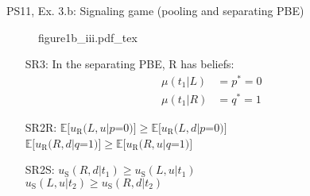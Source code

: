 \begin{frame}{PS11, Ex. 3.b: Signaling game (pooling and separating PBE)}
\begin{multicols}{2}
\begin{figure}[!h]
        {figure1b_iii.pdf_tex}
      \end{figure} \vspace{-8pt}
      \begin{itemize}
        \item[SR3:] In the separating PBE, R has beliefs:\vspace{-10pt}
        \begin{align*}
          \mu(t_1|L)&=p^*=0&\\
          \mu(t_1|R)&=q^*=1
        \end{align*}
        \item[SR2R:] \vspace{-6pt}
                     $\mathbb{E}[u_\text{R}(L,u|p$=$0)]\geq\mathbb{E}[u_\text{R}(L,d|p$=$0)]$\\
                     $\mathbb{E}[u_\text{R}(R,d|q$=$1)]\geq \mathbb{E}[u_\text{R}(R,u|q$=$1)]$
        \item[SR2S:] $u_\text{S}(R,d|t_1)\geq u_\text{S}(L,u|t_1)$\\
                     $u_\text{S}(L,u|t_2)\geq u_\text{S}(R,d|t_2)$
      \end{itemize}
      \vfill\null \columnbreak
      \vfill
    \end{multicols}
\end{frame}
